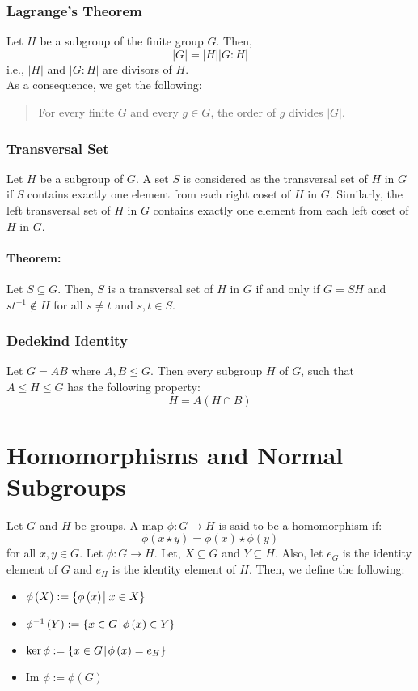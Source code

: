 \documentclass[12pt, oneside]{book}
\newcommand{\im}{\text{Im }}
\begin{document}
\subsubsection{Lagrange's Theorem}
Let \(H\) be a subgroup of the finite group \(G\).
Then,
\[\left|G\right| = \left|H\right|\left|G:H\right| \]
i.e., \(|H|\) and \(|G:H|\) are divisors of \(H\).\\
As a consequence, we get the following:
\begin{quote}
	For every finite \(G\) and every \(g \in G\), the order of \(g\) divides \(|G|\).
\end{quote}

\subsubsection{Transversal Set}
Let \(H\) be a subgroup of \(G\).
A set \(S\) is considered as the transversal set of \(H\) in \(G\) if \(S\) contains exactly one element from each right coset of \(H\) in \(G\).
Similarly, the left transversal set of \(H\) in \(G\) contains exactly one element from each left coset of \(H\) in \(G\).
\paragraph{Theorem:} Let \(S \subseteq G\).
Then, \(S\) is a transversal set of \(H\) in \(G\) if and only if \(G = SH\) and \(s t^{-1} \notin H\) for all \(s \neq t\) and \(s,t \in S\).

\subsubsection{Dedekind Identity}
Let \(G = AB\) where \(A,B \leq G\).
Then every subgroup \(H\) of \(G\), such that \(A \leq H \leq G\) has the following property:
\[ H = A \left( H \cap B \right) \]

\section{Homomorphisms and Normal Subgroups}
Let \(G\) and \(H\) be groups.
A map \(\phi: G \rightarrow H\) is said to be a homomorphism if:
\[ \phi \left( x \star y \right) = \phi \left( x \right) \star \phi \left( y \right) \]
for all \(x,y \in G\).
Let \( \phi: G \rightarrow H \).
Let, \(X \subseteq G\) and \(Y \subseteq H\).
Also, let \(e_G\) is the identity element of \(G\) and \(e_H\) is the identity element of \(H\).
Then, we define the following:
\begin{itemize}
	\item \(\phi \left(X\right) := \{ \phi \left(x\right) \: \vline \: x \in X \} \)
	\item \(\phi^{-1} \left(Y\right) := \{ x \in G \: \vline \: \phi \left(x\right) \in Y \} \)
	\item \(\ker{\phi} := \{ x \in G \: \vline \: \phi \left(x\right) = e_H \} \)
	\item \( \im \phi := \phi\left(G\right)\)
\end{itemize}
\end{document}
